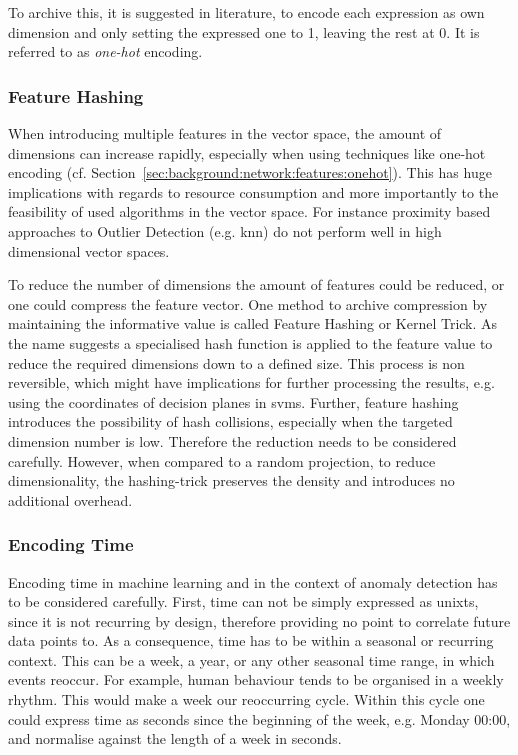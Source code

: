 To archive this, it is suggested in literature, to encode each expression as own dimension and only setting the expressed one to 1, leaving the rest at 0. It is referred to as \emph{one-hot} encoding. \parencite{Coates2011}

\subsubsection{Feature Hashing}
\label{sec:background:network:features:hashing}

When introducing multiple features in the vector space, the  amount of dimensions can increase rapidly, especially when using techniques like one-hot encoding (cf. Section~\ref{sec:background:network:features:onehot}).
This has huge implications with regards to resource consumption and more importantly to the feasibility of used algorithms in the vector space.
For instance proximity based approaches to Outlier Detection (e.g. \gls{knn}) do not perform well in high dimensional vector spaces. \parencite[cf.][]{Beyer1999}

To reduce the number of dimensions the amount of features could be reduced, or one could compress the feature vector. One method to archive compression by maintaining the informative value is called Feature Hashing or Kernel Trick. \parencite{Weinberger2009,Shi2009}
As the name suggests a specialised hash function is applied to the feature value to reduce the required dimensions down to a defined size.
This process is non reversible, which might have implications for further processing the results, e.g. using the coordinates of decision planes in \glspl{svm}.
Further, feature hashing introduces the possibility of hash collisions, especially when the targeted dimension number is low. Therefore the reduction needs to be considered carefully.
However, when compared to a random projection, to reduce dimensionality, the hashing-trick preserves the density and introduces no additional overhead. \parencite{Weinberger2009,Shi2009}

\subsubsection{Encoding Time}
\label{sec:background:network:features:time}

Encoding time in machine learning and in the context of anomaly detection has to be considered carefully.
First, time can not be simply expressed as \gls{unixts}, since it is not recurring by design, therefore providing no point to correlate future data points to.
As a consequence, time has to be within a seasonal or recurring context. This can be a week, a year, or any other seasonal time range, in which events reoccur.
For example, human behaviour tends to be organised in a weekly rhythm. This would make a week our reoccurring cycle. Within this cycle one could express time as seconds since the beginning of the week, e.g. Monday 00:00, and normalise against the length of a week in seconds.

